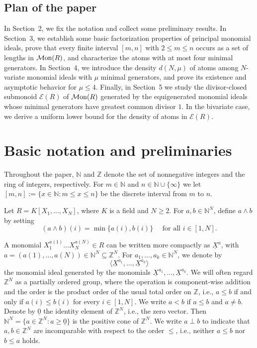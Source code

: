 \documentclass[a4paper,10pt,reqno]{amsart}
\theoremstyle{definition}
\theoremstyle{definition}
\providecommand\Mon{{\mathcal{M}{\rm on}}}
\begin{document}
\subsection*{Plan of the paper} In Section~2, we fix the notation and collect some preliminary results. In Section~3, we establish some basic factorization properties of principal monomial ideals, prove that every finite interval $[m,n]$ with $2\le m\le n$ occurs as a set of lengths in $\Mon(R)$, and characterize the atoms with at most four minimal generators. In Section~4, we introduce the density $d(N,\mu)$ of atoms among $N$-variate monomial ideals with $\mu$ minimal generators, and prove its existence and asymptotic behavior for $\mu\le 4$. Finally, in Section~5 we study the divisor-closed submonoid $\mathcal E(R)$ of $\Mon(R)$ generated by the equigenerated monomial ideals whose minimal generators have greatest common divisor $1$. In the bivariate case, we derive a uniform lower bound for the density of atoms in $\mathcal E(R)$.

\section{Basic notation and preliminaries}

Throughout the paper, $\mathbb{N}$ and $\mathbb{Z}$ denote the set of nonnegative integers and the ring of integers, respectively. For $m\in \mathbb N$ and $n\in\mathbb N \cup \{\infty\}$ we let $[ m, n] := \allowbreak \{x\in \mathbb{N} \colon m\leq x\leq n\}$ be the discrete interval from $m$ to $n$.

\medskip

Let $R=K[X_1,\dots,X_N]$, where $K$ is a field and $N\ge 2$. For $a,b\in \mathbb N^N$, define $a\wedge b$ by setting \[(a\wedge b)(i) = \min\{a(i), b(i)\}\quad \text{ for all }i\in [1,N].\]

A monomial $X_1^{a(1)}\dots X_N^{a(N)}\in R$ can be written more compactly as $\underline X^a$, with $a=(a(1),\dots,a(N))\in \mathbb N^N\subseteq \mathbb Z^N$. For $a_1,\ldots, a_k\in\mathbb N^N$, we denote by
\[\langle \underline{X}^{a_1},\ldots,\underline{X}^{a_k}\rangle\]
the monomial ideal generated by the monomials $\underline{X}^{a_1},\ldots,\underline{X}^{a_k}$.
We will often regard $\mathbb Z^N$ as a partially ordered group, where the operation is component-wise addition and the order is the product order of the usual total order on $\mathbb Z$, i.e., $a\le b$ if and only if $a(i)\le b(i)$ for every $i\in[1,N]$. We write $a<b$ if $a\leq b$ and $a\neq b$. Denote by $\underline 0$ the identity element of $\mathbb Z^N$, i.e., the zero vector. Then $\mathbb N^N = \{a\in\mathbb Z^N\colon a\ge \underline 0\}$ is the positive cone of $\mathbb Z^N$. We write $a\perp b$ to indicate that $a,b\in\mathbb Z^N$ are incomparable with respect to the order $\le$, i.e., neither $a\le b$ nor $b\le a$ holds.
\end{document}
